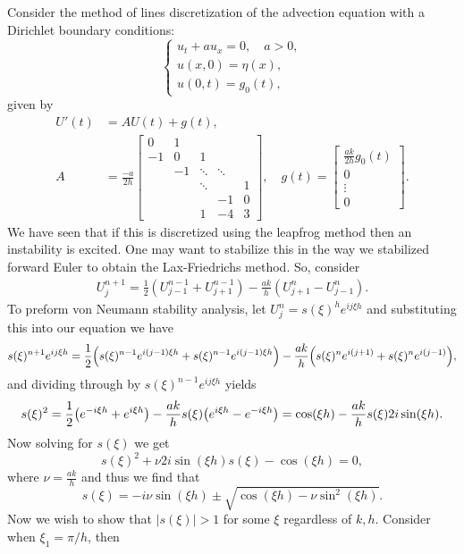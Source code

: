 \documentclass[12pt]{report}
\begin{document}
\begin{solution}

    \noindent
    Consider the method of lines discretization of the advection equation with a Dirichlet boundary conditions:
  $$ \begin{cases} u_t + a u_{x} = 0, \quad a > 0,\\
u(x,0) = \eta(x),\\
u(0,t) = g_0(t), \end{cases} $$
given by
\begin{align*}
  U'(t) &= A U(t) + g(t),\\
  A &= \frac{-a}{2h} \begin{bmatrix} 0 & 1 \\
    -1 & 0 & 1 \\
    & -1 & \ddots & \ddots \\
    && \ddots && 1\\
    &&& -1 & 0 \\
    &&1 & -4 & 3
  \end{bmatrix}, \quad g(t) = \begin{bmatrix} \frac{ak}{2h} g_0(t) \\ 0 \\ \vdots \\ 0 \end{bmatrix}.
\end{align*}
We have seen that if this is discretized using the leapfrog method then an instability is excited.  One may want to stabilize this in the way we stabilized forward Euler to obtain the Lax-Friedrichs method.  So, consider
\begin{align*}
  U_j^{n+1} = \frac 1 2 ( U_{j-1}^{n-1} + U_{j+1}^{n-1}) - \frac{ak}{h} ( U_{j+1}^n - U_{j-1}^n).
\end{align*}
To preform von Neumann stability analysis, let $U_j^n = s(\xi)^h e^{ij\xi h}$ and substituting this into our equation we have
\[ 
  s(\xi)^{n+1}e^{ij\xi h} = \frac{1}{2}{\left(s(\xi)^{n-1}e^{i(j-1)\xi h} + s(\xi)^{n-1}e^{i(j-1)\xi h}\right)} - \frac{ak}{h}{\left(s(\xi)^n e^{i(j+1)} + s(\xi)^n e^{i(j-1)}\right)},
\] 
and dividing through by $s(\xi)^{n-1}e^{ij\xi h}$ yields
\[
  s(\xi)^2  = \frac{1}{2}{\left(e^{-i\xi h} + e^{i \xi h}\right)} - \frac{ak}{h}s(\xi){\left(e^{i\xi h} - e^{-i\xi h}\right)} = \cos(\xi h) - \frac{ak}{h}s(\xi)2i\sin(\xi h).
\]
Now solving for $s(\xi)$ we get 
\[
  s(\xi)^2 + \nu 2i\sin(\xi h)s(\xi) - \cos(\xi h) = 0,
\]
where $\nu = \frac{ak}{h}$ and thus we find that 
\[
  s(\xi) = - i \nu \sin(\xi h) \pm \sqrt{\cos(\xi h) - \nu \sin^2(\xi h)}.
\]
Now we wish to show that $|s(\xi)| > 1$ for some $\xi$ regardless of $k,h$. Consider when $\xi_1 = \pi/h$, then 

\end{solution}
\end{document}
